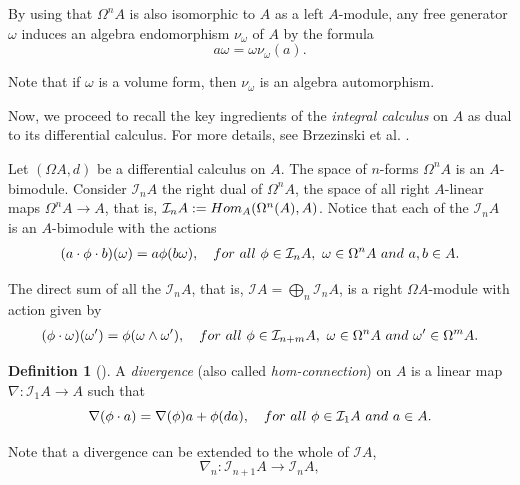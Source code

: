 \documentclass{amsart}
\theoremstyle{definition}
\newtheorem{definition}[theorem]{Definition}
\theoremstyle{remark}
\numberwithin{equation}{section}
\begin{document}
By using that $\Omega^n A$ is also isomorphic to $A$ as a left $A$-module, any free generator $\omega $ induces an algebra endomorphism $\nu_{\omega}$ of $A$ by the formula
\begin{equation}\label{BrzezinskiSitarz2017(2.2)}
    a \omega = \omega \nu_{\omega} (a).
\end{equation}

Note that if $\omega$ is a volume form, then $\nu_{\omega}$ is an algebra automorphism.

Now, we proceed to recall the key ingredients of the {\em integral calculus} on $A$ as dual to its differential calculus. For more details, see Brzezinski et al. \cite{Brzezinski2008, BrzezinskiElKaoutitLomp2010}.

Let $(\Omega A, d)$ be a differential calculus on $A$. The space of $n$-forms $\Omega^n A$ is an $A$-bimodule. Consider $\mathcal{I}_{n}A$ the right dual of $\Omega^{n}A$, the space of all right $A$-linear maps $\Omega^{n}A\rightarrow A$, that is, $\mathcal{I}_{n}A := {\rm Hom}_{A}(\Omega^{n}(A),A)$. Notice that each of the $\mathcal{I}_{n}A$ is an $A$-bimodule with the actions
\begin{align*}
    (a\cdot\phi\cdot b)(\omega)=a\phi(b\omega),\quad {\rm for\ all}\ \phi \in \mathcal{I}_{n}A,\ \omega \in \Omega^{n}A\ {\rm and}\ a,b \in A.
\end{align*}

The direct sum of all the $\mathcal{I}_{n}A$, that is, $\mathcal{I}A = \bigoplus\limits_{n} \mathcal{I}_n A$, is a right $\Omega A$-module with action given by
\begin{align}\label{BrzezinskiSitarz2017(2.3)}
    (\phi\cdot\omega)(\omega')=\phi(\omega\wedge\omega'),\quad {\rm for\ all}\ \phi\in\mathcal{I}_{n + m}A, \ \omega\in \Omega^{n}A \ {\rm and} \ \omega' \in \Omega^{m}A.
\end{align}

\begin{definition}[{\cite[Definition 2.1]{Brzezinski2008}}]
A {\em divergence} (also called {\em hom-connection}) on $A$ is a linear map $\nabla: \mathcal{I}_1 A \to A$ such that
\begin{equation}\label{BrzezinskiSitarz2017(2.4)}
    \nabla(\phi \cdot a) = \nabla(\phi) a + \phi(da), \quad {\rm for\ all}\ \phi \in \mathcal{I}_1 A \ {\rm and} \ a \in A.
\end{equation}  
\end{definition}

Note that a divergence can be extended to the whole of $\mathcal{I}A$, 
\[
\nabla_n: \mathcal{I}_{n+1} A \to \mathcal{I}_{n} A,
\]
\end{document}
